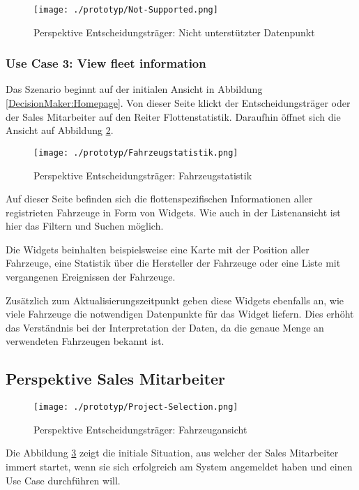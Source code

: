 \begin{figure}[ht]
  \centering
  \texttt{[image: ./prototyp/Not-Supported.png]}
  \caption{Perspektive Entscheidungsträger: Nicht unterstützter Datenpunkt}
  \label{DecisionMaker:NotSupported}
\end{figure}

\subsubsection{Use Case 3: View fleet information}
Das Szenario beginnt auf der initialen Ansicht in Abbildung \ref{DecisionMaker:Homepage}. Von dieser Seite klickt der Entscheidungsträger oder der Sales Mitarbeiter auf den Reiter Flottenstatistik. Daraufhin öffnet sich die Ansicht auf Abbildung \ref{DecisionMaker:Fahrzeugstatistik}.
\begin{figure}[H]
  \centering
  \texttt{[image: ./prototyp/Fahrzeugstatistik.png]}
  \caption{Perspektive Entscheidungsträger: Fahrzeugstatistik}
  \label{DecisionMaker:Fahrzeugstatistik}
\end{figure}
Auf dieser Seite befinden sich die flottenspezifischen Informationen aller registrieten Fahrzeuge in Form von Widgets. Wie auch in der Listenansicht ist hier das Filtern und Suchen möglich.

Die Widgets beinhalten beispielsweise eine Karte mit der Position aller Fahrzeuge, eine Statistik über die Hersteller der Fahrzeuge oder eine Liste mit vergangenen Ereignissen der Fahrzeuge. 

Zusätzlich zum Aktualisierungszeitpunkt geben diese Widgets ebenfalls an, wie viele Fahrzeuge die notwendigen Datenpunkte für das Widget liefern. Dies erhöht das Verständnis bei der Interpretation der Daten, da die genaue Menge an verwendeten Fahrzeugen bekannt ist.

\newpage
\subsection{Perspektive Sales Mitarbeiter}

\begin{figure}[ht]
  \centering
  \texttt{[image: ./prototyp/Project-Selection.png]}
  \caption{Perspektive Entscheidungsträger: Fahrzeugansicht}
  \label{Configurator:ProjectSelection}
\end{figure}
Die Abbildung \ref{Configurator:ProjectSelection} zeigt die initiale Situation, aus welcher der Sales Mitarbeiter immert startet, wenn sie sich erfolgreich am System angemeldet haben und einen Use Case durchführen will.

